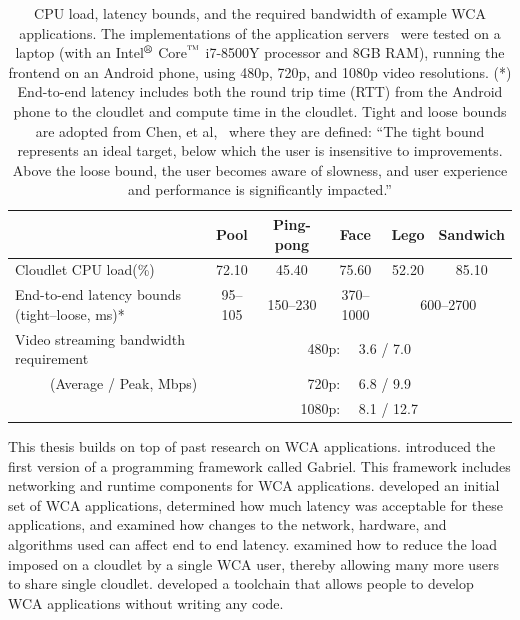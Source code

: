 \begin{table}
    \begin{tabular}{|l||c|c|c|c|c|}
    \hline
    & Pool & Ping-pong & Face & Lego & Sandwich \\
    \hline
    \hline
    Cloudlet CPU load(\%) & 72.10 & 45.40 & 75.60 & 52.20 & 85.10 \\
    \hline
    End-to-end latency bounds (tight--loose, ms)* & 95--105 & 150--230 & 370--1000 & \multicolumn{2}{c|}{600--2700} \\
    \hline
    Video streaming bandwidth requirement    & \multicolumn{5}{c|}{480p:~~ 3.6 / 7.0} \\
    ~~~~~(Average / Peak, Mbps)              & \multicolumn{5}{c|}{720p:~~ 6.8 / 9.9} \\
                                             & \multicolumn{5}{c|}{1080p:~~ 8.1 / 12.7} \\
    \hline
    \end{tabular}
    \caption{
      CPU load, latency bounds, and the required bandwidth of example WCA
      applications.
      The implementations of the application servers~\cite{chen2017} were tested
      on a laptop (with an Intel$^{\mbox{\footnotesize\textregistered}}$
      Core$^{\mbox{\footnotesize\texttrademark}}$ i7-8500Y processor and 8GB RAM),
      running the frontend on an Android phone, using 480p, 720p, and 1080p
      video resolutions.
      (*) End-to-end latency includes both the round trip time (RTT) from the
      Android phone to the cloudlet and compute time in the cloudlet.
      Tight and loose bounds are adopted from Chen, et al,~\cite{chen2017}
      where they are defined:
      ``The tight bound represents an ideal target, below which the user is
      insensitive to improvements. Above the loose bound, the user becomes aware
      of slowness, and user experience and performance is significantly
      impacted.''
    }\label{fig:wca_apps}
\end{table}

This thesis builds on top of past research on WCA applications.
\citet{ha2014} introduced the first version of a programming framework called
Gabriel.
This framework includes networking and runtime components for WCA applications.
\citet{chen2017} developed an initial set of WCA applications, determined
how much latency was acceptable for these applications, and examined how changes
to the network, hardware, and algorithms used can affect end to end latency.
\citet{wang2019} examined how to reduce  the load imposed
on a cloudlet by a single WCA user, thereby allowing many more
users to share single cloudlet.
\citet{pham2021ajalon} developed a toolchain that
allows people to develop WCA applications without writing any code.

